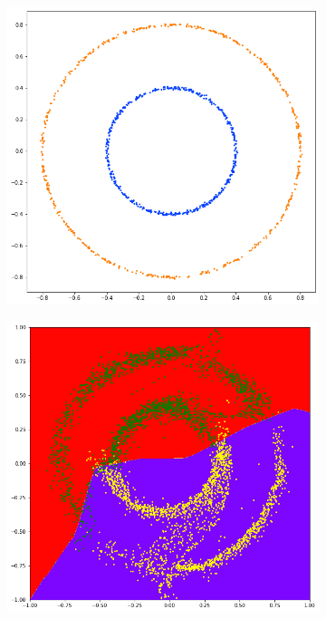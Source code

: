 \begin{figure}
\centering
  \begin{subfigure}[t]{.24\textwidth}
    \centering
    \includegraphics[width=0.9\linewidth]{figures/original_2_circles.png}
  \end{subfigure}%
  \begin{subfigure}[t]{.24\textwidth}
    \centering
    \includegraphics[width=0.9\linewidth]{figures/trained_2_circles_2.png}
  \end{subfigure}

\end{figure}
